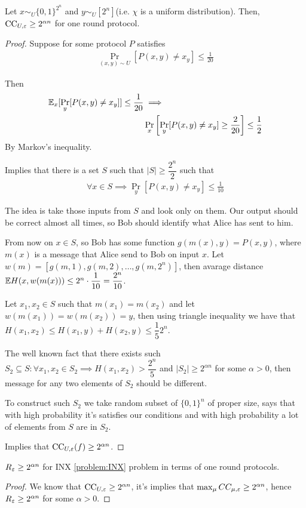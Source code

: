 \begin{thm}
	Let $x \sim_U \{0, 1\}^{2^n}$ and $y \sim_U [2^n]$(i.e. $\chi$ is a uniform distribution).	
	Then,~$\operatorname{CC}_{U, \varepsilon} \geq 2^{\alpha n}$ for one round protocol.
\end{thm}

\begin{proof}
	Suppose for some protocol $P$ satisfies
	\begin{align*}
		\Pr_{(x, y)\sim U}[P(x, y) \neq x_y] \leq \frac 1 {20}
	\end{align*}
	
	Then
	\begin{align*}
		\mathbb{E}_x[\Pr_y[P(x, y) \neq x_y]] \leq \frac 1 {20} &\implies \\
&\Pr_x\left[\Pr_y[P(x, y) \neq x_y] \geq \frac 2 {20}\right] \leq \frac 1 2
	\end{align*} By Markov's inequality.
	
	Implies that there is a set $S$ such that $|S| \geq \dfrac {2^n} 2$ such that
	\begin{align*}
		\forall x \in S \implies \Pr_y[P(x, y) \neq x_y] \leq \frac 1 {10}
	\end{align*}
	
	The idea is take those inputs from $S$ and look only on them.
	Our output should be correct almost all times, so Bob should identify what Alice has sent to him.
	
	From now on $x \in S$, so Bob has some function $g(m(x), y) = P(x, y)$, where $m(x)$ is a message that Alice send to Bob on input $x$.
	Let $w(m) = [g(m, 1), g(m, 2), \dots, g(m, 2^n)]$, then avarage distance $\mathbb{E} H(x, w(m(x))) \leq 2^n \cdot \dfrac 1 {10} = \dfrac {2^n} {10}$.
	
	Let $x_1, x_2 \in S$ such that $m(x_1) = m(x_2)$ and let $w(m(x_1)) = w(m(x_2) ) = y$, then using triangle inequality we have that $H(x_1, x_2) \leq H(x_1, y) + H(x_2, y) \leq \dfrac 1 5 2^n$.
	
	The well known fact that there exists such $S_2 \subseteq S \colon \forall x_1, x_2 \in S_2 \implies H(x_1, x_2) > \dfrac {2^n} 5$ and $|S_2| \geq 2^{\alpha n}$ for some $\alpha > 0$, then message for any two elements of $S_2$ should be different.
	
	To construct such $S_2$ we take random subset of $\{0, 1\}^n$ of proper size, says that with high probability it's satisfies our conditions and with high probability a lot of elements from $S$ are in $S_2$.
	
	Implies that $\operatorname{CC}_{U, \varepsilon} (f) \geq 2^{\alpha n}$.
\end{proof}

\begin{crly}
	$R_\varepsilon \geq 2^{\alpha n}$ for INX \ref{problem:INX} problem in terms of one round protocols.
\end{crly}
\begin{proof}
		We know that $\operatorname{CC}_{U, \varepsilon} \geq 2^{\alpha n}$, it's implies that $\max_\mu CC_{\mu, \varepsilon} \geq 2^{\alpha n}$, hence $R_\varepsilon \geq 2^{\alpha n}$ for some $\alpha > 0$.
\end{proof}


